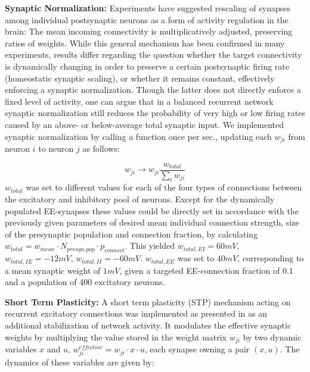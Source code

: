 \documentclass[10pt,a4paper]{article}
\begin{document}
\textbf{Synaptic Normalization:} Experiments have suggested rescaling of synapses among individual postsynaptic neurons as a form of activity regulation in the brain: The mean incoming connectivity is multiplicatively adjusted, preserving ratios of weights. While this general mechanism has been confirmed in many experiments, results differ regarding the question whether the target connectivity is dynamically changing in order to preserve a certain postsynaptic firing rate (homeostatic synaptic scaling), or whether it remains constant, effectively enforcing a synaptic normalization. Though the latter does not directly enforce a fixed level of activity, one can argue that in a balanced recurrent network synaptic normalization still reduces the probability of very high or low firing rates caused by an above- or below-average total synaptic input. We implemented synaptic normalization by calling a function once per sec., updating each $w_{ji}$ from neuron $i$ to neuron $j$ as follows:

\begin{equation}
w_{ji} \rightarrow w_{ji} \frac{w_{total}}{\sum_i w_{ji}}
\label{Synnnorm}
\end{equation}
$w_{total}$ was set to different values for each of the four types of connections between the excitatory and inhibitory pool of neurons. Except for the dynamically populated EE-synapses these values could be directly set in accordance with the previously given parameters of desired mean individual connection strength, size of the presynaptic population and connection fraction, by calculating $w_{total} = w_{mean} \cdot N_{presyn. pop}\cdot p_{connect}$. This yielded $w_{total,EI} = 60 mV$, $w_{total,IE} = -12 mV$, $w_{total,II} = -60 mV$. $w_{total,EE}$ was set to $40mV$,  corresponding to a mean synaptic weight of $1mV$, given a targeted EE-connection fraction of $0.1$ and a population of 400 excitatory neurons.

\textbf{Short Term Plasticity:} A short term plasticity (STP) mechanism acting on recurrent excitatory connections was implemented as presented in \cite{Markram_STP} as an additional stabilization of network activity. It modulates the effective synaptic weights by multiplying the value stored in the weight matrix $w_{ji}$ by two dynamic variables $x$ and $u$, $w^{effective}_{ji} = w_{ji}\cdot x \cdot u$, each synapse owning a pair $(x,u)$. The dynamics of these variables are given by:
\end{document}
